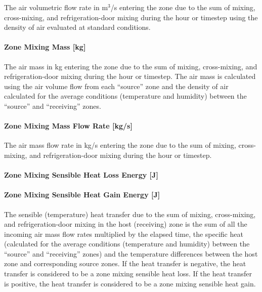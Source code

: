 The air volumetric flow rate in m\(^{3}\)/s entering the zone due to the sum of mixing, cross-mixing, and refrigeration-door mixing during the hour or timestep using the density of air evaluated at standard conditions.

\paragraph{Zone Mixing Mass {[}kg{]}}\label{zone-mixing-mass-kg-1}

The air mass in kg entering the zone due to the sum of mixing, cross-mixing, and refrigeration-door mixing during the hour or timestep. The air mass is calculated using the air volume flow from each ``source'' zone and the density of air calculated for the average conditions (temperature and humidity) between the ``source'' and ``receiving'' zones.

\paragraph{Zone Mixing Mass Flow Rate {[}kg/s{]}}\label{zone-mixing-mass-flow-rate-kgs-1}

The air mass flow rate in kg/s entering the zone due to the sum of mixing, cross-mixing, and refrigeration-door mixing during the hour or timestep.

\paragraph{Zone Mixing Sensible Heat Loss Energy {[}J{]}}\label{zone-mixing-sensible-heat-loss-energy-j-1}

\paragraph{Zone Mixing Sensible Heat Gain Energy {[}J{]}}\label{zone-mixing-sensible-heat-gain-energy-j-1}

The sensible (temperature) heat transfer due to the sum of mixing, cross-mixing, and refrigeration-door mixing in the host (receiving) zone is the sum of all the incoming air mass flow rates multiplied by the elapsed time, the specific heat (calculated for the average conditions (temperature and humidity) between the ``source'' and ``receiving'' zones) and the temperature differences between the host zone and corresponding source zones. If the heat transfer is negative, the heat transfer is considered to be a zone mixing sensible heat loss. If the heat transfer is positive, the heat transfer is considered to be a zone mixing sensible heat gain.

